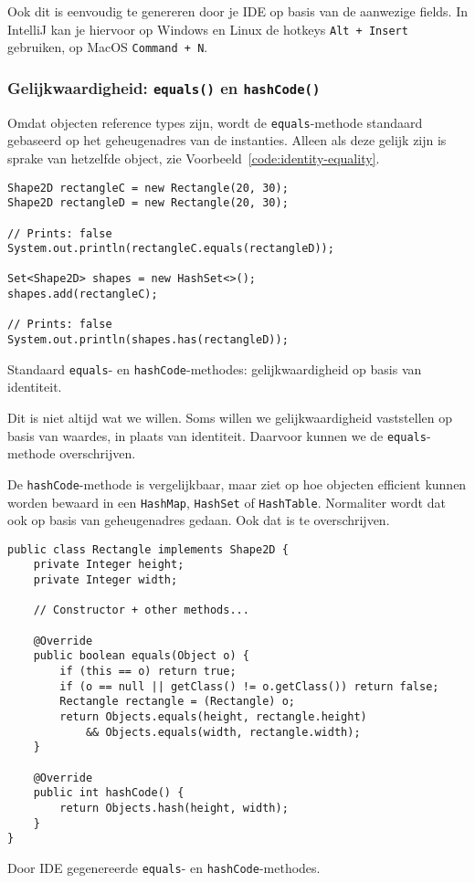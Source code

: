 \documentclass[dutch,a4paper,12pt,doubleside]{book}
\begin{document}
Ook dit is eenvoudig te genereren door je IDE op basis van de aanwezige fields.
In IntelliJ kan je hiervoor op Windows en Linux de hotkeys \texttt{Alt + Insert} gebruiken, 
op MacOS \texttt{Command + N}.

\subsubsection{Gelijkwaardigheid: \texttt{equals()} en \texttt{hashCode()}}
Omdat objecten reference types zijn, wordt de \texttt{equals}-methode standaard gebaseerd 
op het geheugenadres van de instanties. Alleen als deze gelijk zijn is sprake van 
hetzelfde object, zie Voorbeeld~\ref{code:identity-equality}.

\begin{listing}[H]
\begin{verbatim}
Shape2D rectangleC = new Rectangle(20, 30);
Shape2D rectangleD = new Rectangle(20, 30);

// Prints: false
System.out.println(rectangleC.equals(rectangleD));

Set<Shape2D> shapes = new HashSet<>();
shapes.add(rectangleC);

// Prints: false
System.out.println(shapes.has(rectangleD));

\end{verbatim}
\caption{Standaard \texttt{equals}- en \texttt{hashCode}-methodes: 
gelijkwaardigheid op basis van identiteit.}
\label{code:identity-equality}
\end{listing}

Dit is niet altijd wat we willen. Soms willen we gelijkwaardigheid
vaststellen op basis van waardes, in plaats van identiteit. Daarvoor kunnen we 
de \texttt{equals}-methode overschrijven.

De \texttt{hashCode}-methode is vergelijkbaar, maar ziet op hoe objecten 
efficient kunnen worden bewaard in 
een \texttt{HashMap}, \texttt{HashSet} of \texttt{HashTable}.
Normaliter wordt dat ook op basis van geheugenadres gedaan. Ook dat is te overschrijven.

\begin{listing}[H]
\begin{verbatim}
public class Rectangle implements Shape2D {
    private Integer height;
    private Integer width;

    // Constructor + other methods...

    @Override
    public boolean equals(Object o) {
        if (this == o) return true;
        if (o == null || getClass() != o.getClass()) return false;
        Rectangle rectangle = (Rectangle) o;
        return Objects.equals(height, rectangle.height) 
            && Objects.equals(width, rectangle.width);
    }

    @Override
    public int hashCode() {
        return Objects.hash(height, width);
    }
}
\end{verbatim}
\caption{Door IDE gegenereerde \texttt{equals}- en \texttt{hashCode}-methodes.}
\label{code:hashcode-equals}
\end{listing}
\end{document}
